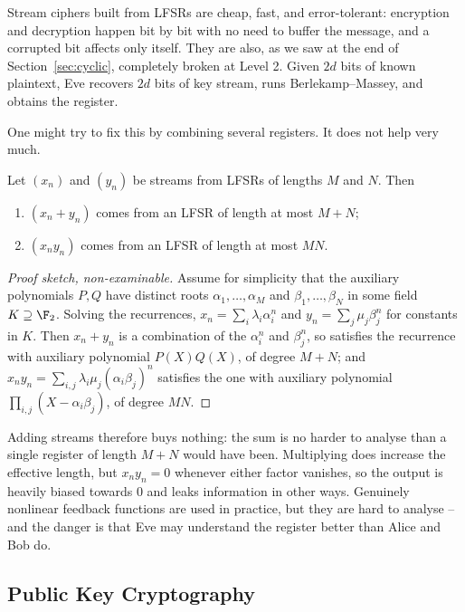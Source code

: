 Stream ciphers built from LFSRs are cheap, fast, and error-tolerant: encryption and decryption happen bit by bit with no need to buffer the message, and a corrupted bit affects only itself. They are also, as we saw at the end of Section~\ref{sec:cyclic}, completely broken at Level 2. Given $2d$ bits of known plaintext, Eve recovers $2d$ bits of key stream, runs Berlekamp--Massey, and obtains the register.

One might try to fix this by combining several registers. It does not help very much.

\begin{lemma}\label{lem:combine}
	Let $(x_n)$ and $(y_n)$ be streams from LFSRs of lengths $M$ and $N$. Then
	\begin{enumerate}[label=(\roman*)]
		\item $(x_n+y_n)$ comes from an LFSR of length at most $M+N$;
		\item $(x_ny_n)$ comes from an LFSR of length at most $MN$.
	\end{enumerate}
\end{lemma}

\begin{proof}[Proof sketch, non-examinable]
	Assume for simplicity that the auxiliary polynomials $P,Q$ have distinct roots $\alpha_1,\dots,\alpha_M$ and $\beta_1,\dots,\beta_N$ in some field $K \supseteq \F_2$. Solving the recurrences, $x_n = \sum_i\lambda_i\alpha_i^n$ and $y_n = \sum_j\mu_j\beta_j^n$ for constants in $K$. Then $x_n+y_n$ is a combination of the $\alpha_i^n$ and $\beta_j^n$, so satisfies the recurrence with auxiliary polynomial $P(X)Q(X)$, of degree $M+N$; and $x_ny_n = \sum_{i,j}\lambda_i\mu_j(\alpha_i\beta_j)^n$ satisfies the one with auxiliary polynomial $\prod_{i,j}(X-\alpha_i\beta_j)$, of degree $MN$.
\end{proof}

Adding streams therefore buys nothing: the sum is no harder to analyse than a single register of length $M+N$ would have been. Multiplying does increase the effective length, but $x_ny_n = 0$ whenever either factor vanishes, so the output is heavily biased towards $0$ and leaks information in other ways. Genuinely nonlinear feedback functions are used in practice, but they are hard to analyse -- and the danger is that Eve may understand the register better than Alice and Bob do.

\subsection{Public Key Cryptography}

